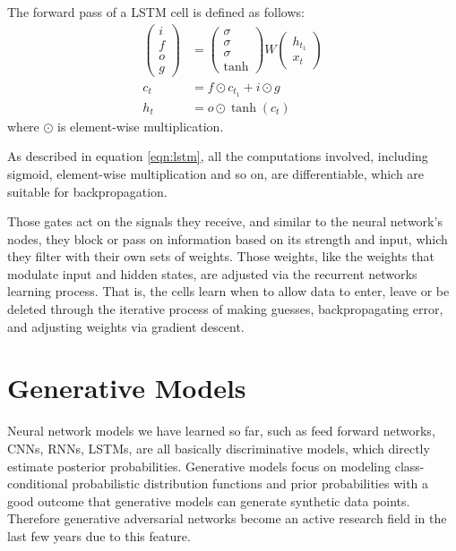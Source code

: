 \documentclass{article} %
\begin{document}
The forward pass of a LSTM cell is defined as follows:
\begin{equation}
\begin{split}
\left(\begin{array}{c} i\\f\\o\\g \end{array}\right) &= \left(\begin{array}{c} \sigma\\\sigma\\\sigma\\\tanh \end{array}\right) W \left(\begin{array}{c} h_{t_1}\\x_t \end{array}\right)  \\  
c_t &= f \odot c_{t_1} + i \odot g\\
h_t &= o \odot \tanh(c_t)
\end{split}
\label{eqn:lstm}
\end{equation}
where $\odot$ is element-wise multiplication.

As described in equation \ref{eqn:lstm}, all the computations involved, including sigmoid,  element-wise multiplication and so on, are differentiable, which are suitable for backpropagation. 

Those gates act on the signals they receive, and similar to the neural network’s nodes, they block or pass on information based on its strength and input, which they filter with their own sets of weights. Those weights, like the weights that modulate input and hidden states, are adjusted via the recurrent networks learning process. That is, the cells learn when to allow data to enter, leave or be deleted through the iterative process of making guesses, backpropagating error, and adjusting weights via gradient descent.


\section{Generative Models}

Neural network models we have learned so far, such as feed forward networks, CNNs, RNNs, LSTMs, are all basically discriminative models, which directly estimate posterior probabilities. Generative models focus on modeling class-conditional probabilistic distribution functions and prior probabilities with a good outcome that generative models can generate synthetic data points. Therefore generative adversarial networks become an active research field in the last few years due to this feature. 
\end{document}
